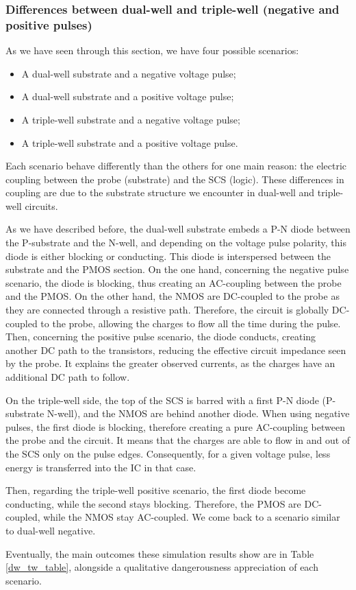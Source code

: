 	\subsubsection{Differences between dual-well and triple-well (negative and positive pulses)}
		As we have seen through this section, we have four possible scenarios:
		\begin{itemize}
			\item A dual-well substrate and a negative voltage pulse;
			\item A dual-well substrate and a positive voltage pulse;
			\item A triple-well substrate and a negative voltage pulse;
			\item A triple-well substrate and a positive voltage pulse.
		\end{itemize}
		Each scenario behave differently than the others for one main reason: the electric coupling between the probe (substrate) and the SCS (logic).
		These differences in coupling are due to the substrate structure we encounter in dual-well and triple-well circuits.

		As we have described before, the dual-well substrate embeds a P-N diode between the P-substrate and the N-well, and depending on the voltage pulse polarity, this diode is either blocking or conducting.
		This diode is interspersed between the substrate and the PMOS section.
		On the one hand, concerning the negative pulse scenario, the diode is blocking, thus creating an AC-coupling between the probe and the PMOS.
		On the other hand, the NMOS are DC-coupled to the probe as they are connected through a resistive path.
		Therefore, the circuit is globally DC-coupled to the probe, allowing the charges to flow all the time during the pulse.
		Then, concerning the positive pulse scenario, the diode conducts, creating another DC path to the transistors, reducing the effective circuit impedance seen by the probe.
		It explains the greater observed currents, as the charges have an additional DC path to follow.

		On the triple-well side, the top of the SCS is barred with a first P-N diode (P-substrate N-well), and the NMOS are behind another diode.
		When using negative pulses, the first diode is blocking, therefore creating a pure AC-coupling between the probe and the circuit.
		It means that the charges are able to flow in and out of the SCS only on the pulse edges.
		Consequently, for a given voltage pulse, less energy is transferred into the IC in that case.

		Then, regarding the triple-well positive scenario, the first diode become conducting, while the second stays blocking.
		Therefore, the PMOS are DC-coupled, while the NMOS stay AC-coupled.
		We come back to a scenario similar to dual-well negative.

		
		Eventually, the main outcomes these simulation results show are in Table \ref{dw_tw_table}, alongside a qualitative dangerousness appreciation of each scenario.

